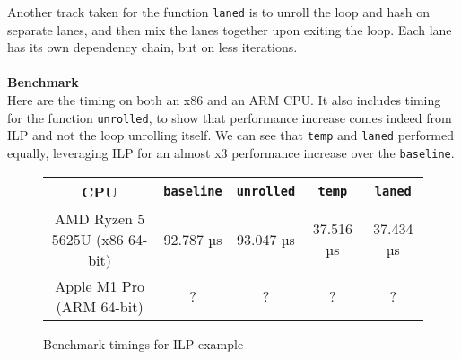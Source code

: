 \documentclass[11pt]{article}
\begin{document}
Another track taken for the function \texttt{laned} is to unroll the loop and hash on separate lanes, and then mix the lanes together upon exiting the loop. Each lane has its own dependency chain, but on less iterations.
\\\\
\textbf{Benchmark}\\
Here are the timing on both an x86 and an ARM CPU. It also includes timing for the function \texttt{unrolled}, to show that performance increase comes indeed from ILP and not the loop unrolling itself.
We can see that \texttt{temp} and \texttt{laned} performed equally, leveraging ILP for an almost x3 performance increase over the \texttt{baseline}.
\\
\begin{figure}[h]
    \centering  %
    \begin{tabular}{|c|c|c|c|c|}
        \hline
        CPU & \texttt{baseline} & \texttt{unrolled} & \texttt{temp} & \texttt{laned} \\
        \hline
        AMD Ryzen 5 5625U (x86 64-bit) & 92.787 µs & 93.047 µs & 37.516 µs & 37.434 µs \\
        Apple M1 Pro (ARM 64-bit) & ? & ? & ? & ? \\
        \hline
    \end{tabular}
    \caption{Benchmark timings for ILP example}
    \label{tab:your_table_label}
\end{figure}
\end{document}
